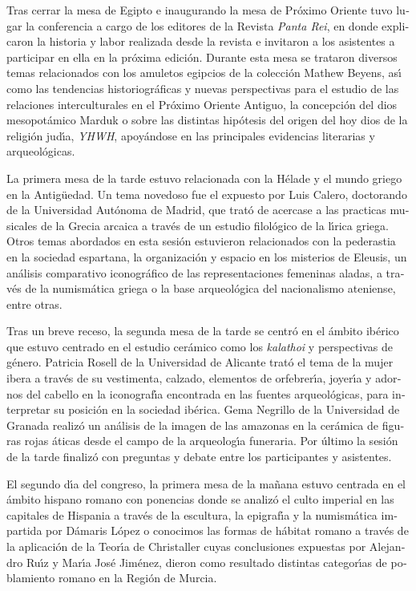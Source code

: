 \documentclass[spanish]{ijsra}
\begin{document}
\begin{otherlanguage}{spanish}
Tras cerrar la mesa de Egipto e inaugurando la mesa de Pr\'{o}ximo Oriente tuvo lugar la conferencia a cargo de los editores de la Revista \textit{Panta Rei}, en donde explicaron la historia y labor realizada desde la revista e invitaron a los asistentes a participar en ella en la pr\'{o}xima edici\'{o}n. Durante esta mesa se trataron diversos temas relacionados con los amuletos egipcios de la colecci\'{o}n Mathew Beyens, as\'{\i} como las tendencias historiogr\'{a}ficas y nuevas perspectivas para el estudio de las relaciones interculturales en el Pr\'{o}ximo Oriente Antiguo, la concepci\'{o}n del dios mesopot\'{a}mico Marduk o sobre las distintas hip\'{o}tesis del origen del hoy dios de la religi\'{o}n jud\'{\i}a, \textit{YHWH}, apoy\'{a}ndose en las principales evidencias literarias y arqueol\'{o}gicas.

La primera mesa de la tarde estuvo relacionada con la H\'{e}lade y el mundo griego en la Antig\"{u}edad. Un tema novedoso fue el expuesto por Luis Calero, doctorando de la Universidad Aut\'{o}noma de Madrid,  que trat\'{o} de acercase a las practicas musicales de la Grecia arcaica a trav\'{e}s de un estudio filol\'{o}gico de la l\'{\i}rica griega. Otros temas abordados en esta sesi\'{o}n estuvieron relacionados con la pederastia en la sociedad espartana, la organizaci\'{o}n y espacio en los misterios de Eleusis, un an\'{a}lisis comparativo iconogr\'{a}fico de las representaciones femeninas aladas, a trav\'{e}s de la numism\'{a}tica griega o la base arqueol\'{o}gica del nacionalismo ateniense, entre otras. 

Tras un breve receso, la segunda mesa de la tarde se centr\'{o} en el \'{a}mbito ib\'{e}rico que estuvo centrado en el estudio cer\'{a}mico como los \textit{kalathoi} y perspectivas de g\'{e}nero. Patricia Rosell de la Universidad de Alicante trat\'{o} el tema de la mujer ibera a trav\'{e}s de su vestimenta, calzado, elementos de orfebrer\'{\i}a, joyer\'{\i}a y adornos del cabello en la iconograf\'{\i}a encontrada en las fuentes arqueol\'{o}gicas, para interpretar su posici\'{o}n en la sociedad ib\'{e}rica. Gema Negrillo de la Universidad de Granada realiz\'{o} un an\'{a}lisis de la imagen de las amazonas en la cer\'{a}mica de figuras rojas \'{a}ticas desde el campo de la arqueolog\'{\i}a funeraria.  Por \'{u}ltimo la sesi\'{o}n de la tarde finaliz\'{o} con preguntas y debate entre los participantes y asistentes.
 
El segundo d\'{\i}a del congreso, la primera mesa de la ma\~{n}ana estuvo centrada en el \'{a}mbito hispano romano con ponencias donde se analiz\'{o} el culto imperial en las capitales de Hispania a trav\'{e}s de la escultura, la epigraf\'{\i}a y la numism\'{a}tica impartida por D\'{a}maris L\'{o}pez o conocimos las formas de h\'{a}bitat romano a trav\'{e}s de la aplicaci\'{o}n de la Teor\'{\i}a de Christaller cuyas conclusiones expuestas por Alejandro Ru\'{\i}z y Mar\'{\i}a Jos\'{e} Jim\'{e}nez, dieron como resultado distintas categor\'{\i}as de poblamiento romano en la Regi\'{o}n de Murcia. 


\end{otherlanguage}
\end{document}
